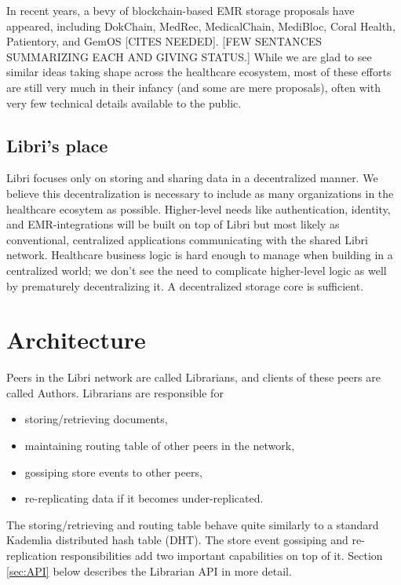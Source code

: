 \documentclass[10pt]{article}
\begin{document}
In recent years, a bevy of blockchain-based EMR storage proposals have appeared, including DokChain, MedRec, MedicalChain, MediBloc, Coral Health, Patientory, and GemOS [CITES NEEDED]. [FEW SENTANCES SUMMARIZING EACH AND GIVING STATUS.] While we are glad to see similar ideas taking shape across the healthcare ecosystem, most of these efforts are still very much in their infancy (and some are mere proposals), often with very few technical details available to the public. 

\subsection{Libri's place}
Libri focuses only on storing and sharing data in a decentralized manner. We believe this decentralization is necessary to include as many organizations in the healthcare ecosytem as possible. Higher-level needs like authentication, identity, and EMR-integrations will be built on top of Libri but most likely as conventional, centralized applications communicating with the shared Libri network. Healthcare business logic is hard enough to manage when building in a centralized world; we don't see the need to complicate higher-level logic as well by prematurely decentralizing it. A decentralized storage core is sufficient.


\section{Architecture}
\label{sec:arch}

Peers in the Libri network are called Librarians, and clients of these peers are called Authors. Librarians are responsible for 
\begin{itemize}
	\item storing/retrieving documents,
	\item maintaining routing table of other peers in the network,
	\item gossiping store events to other peers,
	\item re-replicating data if it becomes under-replicated.
\end{itemize}
The storing/retrieving and routing table behave quite similarly to a standard Kademlia \cite{kademlia} distributed hash table (DHT). The store event gossiping and re-replication responsibilities add two important capabilities on top of it. Section \ref{sec:API} below describes the Librarian API in more detail.
\end{document}
